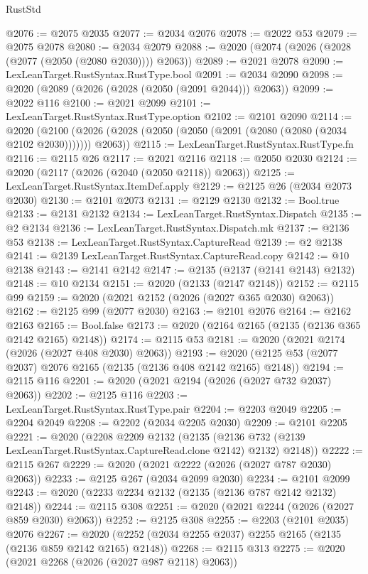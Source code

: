 \begin{lexlean}{RustStd}
\begin{coremodule}
{\begin{coremodule}
{{{{{{{{{{{{{{{{{{{{{{{{{{{{{{{{{{{{{@2076 := @2075 @2035
@2077 := @2034 @2076
@2078 := @2022 @53
@2079 := @2075 @2078
@2080 := @2034 @2079
@2088 := @2020 (@2074 (@2026 (@2028 (@2077 (@2050 (@2080 @2030)))) @2063))
@2089 := @2021 @2078
@2090 := LexLeanTarget.RustSyntax.RustType.bool
@2091 := @2034 @2090
@2098 := @2020 (@2089 (@2026 (@2028 (@2050 (@2091 @2044))) @2063))
@2099 := @2022 @116
@2100 := @2021 @2099
@2101 := LexLeanTarget.RustSyntax.RustType.option
@2102 := @2101 @2090
@2114 := @2020
    (@2100 (@2026 (@2028 (@2050 (@2050 (@2091 (@2080 (@2080 (@2034 @2102 @2030))))))) @2063))
@2115 := LexLeanTarget.RustSyntax.RustType.fn
@2116 := @2115 @26
@2117 := @2021 @2116
@2118 := @2050 @2030
@2124 := @2020 (@2117 (@2026 (@2040 (@2050 @2118)) @2063))
@2125 := LexLeanTarget.RustSyntax.ItemDef.apply
@2129 := @2125 @26 (@2034 @2073 @2030)
@2130 := @2101 @2073
@2131 := @2129 @2130
@2132 := Bool.true
@2133 := @2131 @2132
@2134 := LexLeanTarget.RustSyntax.Dispatch
@2135 := @2 @2134
@2136 := LexLeanTarget.RustSyntax.Dispatch.mk
@2137 := @2136 @53
@2138 := LexLeanTarget.RustSyntax.CaptureRead
@2139 := @2 @2138
@2141 := @2139 LexLeanTarget.RustSyntax.CaptureRead.copy
@2142 := @10 @2138
@2143 := @2141 @2142
@2147 := @2135 (@2137 (@2141 @2143) @2132)
@2148 := @10 @2134
@2151 := @2020 (@2133 (@2147 @2148))
@2152 := @2115 @99
@2159 := @2020 (@2021 @2152 (@2026 (@2027 @365 @2030) @2063))
@2162 := @2125 @99 (@2077 @2030)
@2163 := @2101 @2076
@2164 := @2162 @2163
@2165 := Bool.false
@2173 := @2020 (@2164 @2165 (@2135 (@2136 @365 @2142 @2165) @2148))
@2174 := @2115 @53
@2181 := @2020 (@2021 @2174 (@2026 (@2027 @408 @2030) @2063))
@2193 := @2020 (@2125 @53 (@2077 @2037) @2076 @2165 (@2135 (@2136 @408 @2142 @2165) @2148))
@2194 := @2115 @116
@2201 := @2020 (@2021 @2194 (@2026 (@2027 @732 @2037) @2063))
@2202 := @2125 @116
@2203 := LexLeanTarget.RustSyntax.RustType.pair
@2204 := @2203 @2049
@2205 := @2204 @2049
@2208 := @2202 (@2034 @2205 @2030)
@2209 := @2101 @2205
@2221 := @2020
    (@2208
      @2209
      @2132
      (@2135 (@2136 @732 (@2139 LexLeanTarget.RustSyntax.CaptureRead.clone @2142) @2132) @2148))
@2222 := @2115 @267
@2229 := @2020 (@2021 @2222 (@2026 (@2027 @787 @2030) @2063))
@2233 := @2125 @267 (@2034 @2099 @2030)
@2234 := @2101 @2099
@2243 := @2020 (@2233 @2234 @2132 (@2135 (@2136 @787 @2142 @2132) @2148))
@2244 := @2115 @308
@2251 := @2020 (@2021 @2244 (@2026 (@2027 @859 @2030) @2063))
@2252 := @2125 @308
@2255 := @2203 (@2101 @2035) @2076
@2267 := @2020 (@2252 (@2034 @2255 @2037) @2255 @2165 (@2135 (@2136 @859 @2142 @2165) @2148))
@2268 := @2115 @313
@2275 := @2020 (@2021 @2268 (@2026 (@2027 @987 @2118) @2063))
}}}}}}}}}}}}}}}}}}}}}}}}}}}}}}}}}}}}}
\end{coremodule}}
\end{coremodule}
\end{lexlean}
